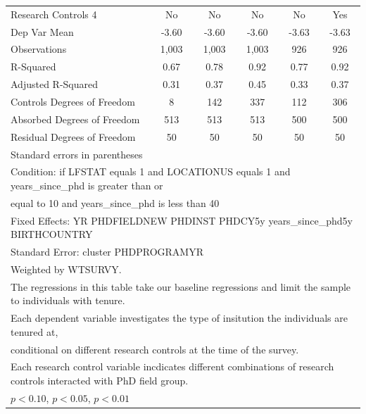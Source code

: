 \begin{table}[htbp]
\begin{tabular}{l*{5}{c}}
Research Controls 4&          No         &          No         &          No         &          No         &         Yes         \\
Dep Var Mean&       -3.60         &       -3.60         &       -3.60         &       -3.63         &       -3.63         \\
Observations&       1,003         &       1,003         &       1,003         &         926         &         926         \\
R-Squared&        0.67         &        0.78         &        0.92         &        0.77         &        0.92         \\
Adjusted R-Squared&        0.31         &        0.37         &        0.45         &        0.33         &        0.37         \\
Controls Degrees of Freedom&           8         &         142         &         337         &         112         &         306         \\
Absorbed Degrees of Freedom&         513         &         513         &         513         &         500         &         500         \\
Residual Degrees of Freedom&          50         &          50         &          50         &          50         &          50         \\
\hline\hline
\multicolumn{6}{l}{\footnotesize Standard errors in parentheses}\\
\multicolumn{6}{l}{\footnotesize Condition: if LFSTAT equals 1 and LOCATIONUS equals 1 and years\_since\_phd is greater than or}\\
\multicolumn{6}{l}{\footnotesize equal to 10 and years\_since\_phd is less than 40}\\
\multicolumn{6}{l}{\footnotesize Fixed Effects: YR PHDFIELDNEW PHDINST PHDCY5y years\_since\_phd5y BIRTHCOUNTRY}\\
\multicolumn{6}{l}{\footnotesize Standard Error: cluster PHDPROGRAMYR}\\
\multicolumn{6}{l}{\footnotesize Weighted by WTSURVY.}\\
\multicolumn{6}{l}{\footnotesize The regressions in this table take our baseline regressions and limit the sample to individuals with tenure.}\\
\multicolumn{6}{l}{\footnotesize Each dependent variable investigates the type of insitution the individuals are tenured at,}\\
\multicolumn{6}{l}{\footnotesize conditional on different research controls at the time of the survey.}\\
\multicolumn{6}{l}{\footnotesize Each research control variable incdicates different combinations of research controls interacted with PhD field group.}\\
\multicolumn{6}{l}{\footnotesize \sym{*} \(p<0.10\), \sym{**} \(p<0.05\), \sym{***} \(p<0.01\)}\\
\end{tabular}
\end{table}
